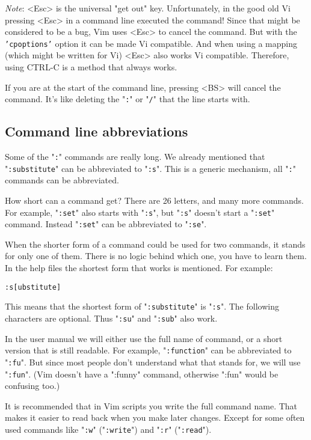 \emph{Note}:
<Esc> is the universal "get out" key.
Unfortunately, in the good old Vi pressing <Esc> in a command line executed the command!
Since that might be considered to be a bug, Vim uses <Esc> to cancel the command.
But with the \texttt{'cpoptions'} option it can be made Vi compatible.
And when using a mapping (which might be written for Vi) <Esc> also works Vi compatible.
Therefore, using CTRL-C is a method that always works.

If you are at the start of the command line, pressing <BS> will cancel the command.
It's like deleting the "\texttt{:}" or "\texttt{/}" that the line starts with.
\subsection{Command line abbreviations}
Some of the "\texttt{:}" commands are really long.
We already mentioned that "\texttt{:substitute}" can be abbreviated to "\texttt{:s}".
This is a generic mechanism, all "\texttt{:}" commands can be abbreviated.

How short can a command get?  There are 26 letters, and many more commands.
For example, "\texttt{:set}" also starts with "\texttt{:s}", but "\texttt{:s}" doesn't start a "\texttt{:set}" command.
Instead "\texttt{:set}" can be abbreviated to "\texttt{:se}".

When the shorter form of a command could be used for two commands, it stands for only one of them.
There is no logic behind which one, you have to learn them.
In the help files the shortest form that works is mentioned.
For example:

\begin{Verbatim}[samepage=true]
 :s[ubstitute]
\end{Verbatim}

This means that the shortest form of "\texttt{:substitute}" is "\texttt{:s}".
The following characters are optional.
Thus "\texttt{:su}" and "\texttt{:sub}" also work.

In the user manual we will either use the full name of command, or a short version that is still readable.
For example, "\texttt{:function}" can be abbreviated to "\texttt{:fu}".
But since most people don't understand what that stands for, we will use "\texttt{:fun}".
(Vim doesn't have a ":funny" command, otherwise ":fun" would be confusing too.)

It is recommended that in Vim scripts you write the full command name.
That makes it easier to read back when you make later changes.
Except for some often used commands like "\texttt{:w}" ("\texttt{:write}") and "\texttt{:r}" ("\texttt{:read}").

